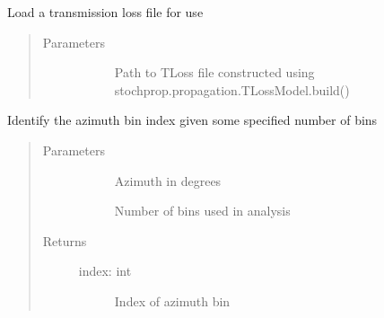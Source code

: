 \documentclass[letterpaper,10pt,english]{sphinxmanual}
\begin{document}
\begin{fulllineitems}
\begin{fulllineitems}
\label{\detokenize{stochprop.propagation:stochprop.propagation.TLossModel.load}}
Load a transmission loss file for use
\begin{quote}\begin{description}
\item[{Parameters}] \leavevmode\begin{description}
\item[{}] \leavevmode
Path to TLoss file constructed using stochprop.propagation.TLossModel.build()

\end{description}

\end{description}\end{quote}

\end{fulllineitems}


\end{fulllineitems}


\begin{fulllineitems}
\label{\detokenize{stochprop.propagation:stochprop.propagation.find_azimuth_bin}}
Identify the azimuth bin index given some specified number of bins
\begin{quote}\begin{description}
\item[{Parameters}] \leavevmode\begin{description}
\item[{}] \leavevmode
Azimuth in degrees

\item[{}] \leavevmode
Number of bins used in analysis

\end{description}

\item[{Returns}] \leavevmode\begin{description}
\item[{index: int}] \leavevmode
Index of azimuth bin

\end{description}

\end{description}\end{quote}

\end{fulllineitems}
\end{document}
